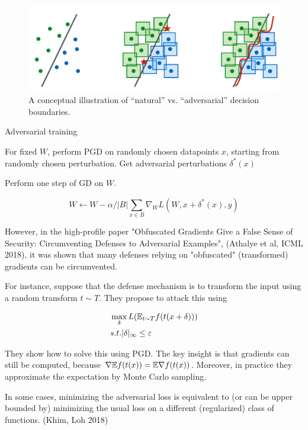 \documentclass[english]{article}
\begin{document}
  \begin{figure}
        \centering
        \includegraphics[scale = 0.35]{natl_adv.PNG}
        
        \caption{A conceptual illustration of “natural” vs. “adversarial” decision boundaries.}
        \label{natl_adv}
    \end{figure}

\item Adversarial training

\benum
\item For fixed $W$, perform PGD on randomly chosen datapoints $x$, starting from randomly chosen perturbation. Get adversarial perturbations $\delta^*(x)$
\item Perform one step of GD on $W$. 

$$W\gets 
W-\alpha/|B|\sum_{x\in B}\nabla_W L(W,x+\delta^*(x),y)
$$
\eenum 

\eenum

\item 
However, in the high-profile paper "Obfuscated Gradients Give a False Sense of Security: Circumventing Defenses to Adversarial Examples", (Athalye et al, ICML 2018), it was shown that many defenses relying on "obfuscated" (transformed) gradients can be circumvented. 

For instance, suppose that the defense mechanism is to transform the input using a random transform $t\sim T$. They propose to attack this using 

\begin{align*}
&\max_\delta L(\mathbb{E}_{t\sim T} f(t(x+\delta)))\\
&s.t. |\delta|_\infty \le \varepsilon
\end{align*}

They show how to solve this using PGD. The key insight is that gradients can still be computed, because $\nabla \mathbb{E} f(t(x)) = \mathbb{E} \nabla f(t(x)) $. Moreover, in practice they approximate the expectation by Monte Carlo sampling.

\item In some cases, minimizing the adversarial loss is equivalent to (or can be upper bounded by) minimizing the usual loss on a different (regularized) class of functions. (Khim, Loh 2018)
\end{document}
